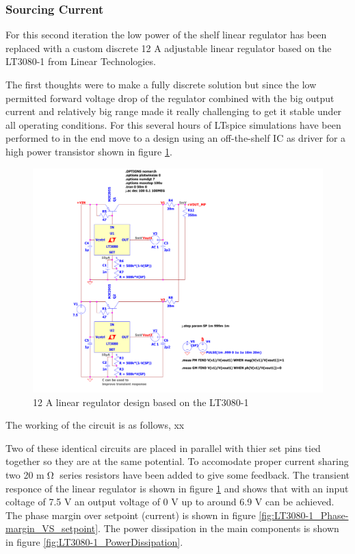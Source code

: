 \subsubsection{Sourcing Current}
For this second iteration the low power of the shelf linear regulator has been replaced with a custom discrete 12 A adjustable linear regulator based on the LT3080-1 from Linear Technologies.

The first thoughts were to make a fully discrete solution but since the low permitted forward voltage drop of the regulator combined with the big output current and relatively big range made it really challenging to get it stable 
under all operating conditions. For this several hours of LTspice simulations have been performed to in the end move to a design using an off-the-shelf IC as driver for a high power transistor shown in figure \ref{fig:LT3080-1_LinRegSchematic}.

\begin{figure}[h!]
    \centering
    \includegraphics[scale=0.25]{LT3080-1_LinRegSchematic.pdf}
    \caption{12 A linear regulator design based on the LT3080-1}
    \label{fig:LT3080-1_LinRegSchematic}
\end{figure}

The working of the circuit is as follows, xx

Two of these identical circuits are placed in parallel with thier set pins tied together so they are at the same potential. To accomodate proper current sharing two 20 m$\tcohm$ series resistors have been added to give some feedback.
The transient responce of the linear regulator is shown in figure \ref{fig:LT3080-1_LinRegSchematic} and shows that with an input coltage of 7.5 V an output voltage of 0 V up to around 6.9 V can be achieved. The phase margin over setpoint (current) is shown in figure \ref{fig:LT3080-1_Phase-margin_VS_setpoint}. The power dissipation in the main components is shown in figure \ref{fig:LT3080-1_PowerDissipation}.

